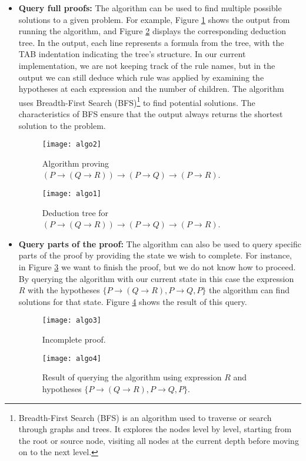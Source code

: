 \begin{itemize}
    \item \textbf{Query full proofs:} The algorithm can be used to find multiple possible solutions to a given problem. For example, Figure \ref{img:algo2} shows the output from running the algorithm, and Figure \ref{img:algo1} displays the corresponding deduction tree. In the output, each line represents a formula from the tree, with the TAB indentation indicating the tree's structure. In our current implementation, we are not keeping track of the rule names, but in the output we can still deduce which rule was applied by examining the hypotheses at each expression and the number of children. The algorithm uses Breadth-First Search (BFS)\footnote{Breadth-First Search (BFS) is an algorithm used to traverse or search through graphs and trees. It explores the nodes level by level, starting from the root or source node, visiting all nodes at the current depth before moving on to the next level.} to find potential solutions. The characteristics of BFS ensure that the output always returns the shortest solution to the problem.

    \begin{figure}[htbp]
        \centering
        \texttt{[image: algo2]}
        \caption{Algorithm proving \((P \to (Q \to R)) \to (P \to Q) \to (P \to R)\).}
        \label{img:algo2}
    \end{figure}

    \begin{figure}[htbp]
        \centering
        \texttt{[image: algo1]}
        \caption{Deduction tree for \((P \to (Q \to R)) \to (P \to Q) \to (P \to R)\).}
        \label{img:algo1}
    \end{figure}
        
    \item \textbf{Query parts of the proof:} The algorithm can also be used to query specific parts of the proof by providing the state we wish to complete. For instance, in Figure \ref{img:algo3} we want to finish the proof, but we do not know how to proceed. By querying the algorithm with our current state in this case the expression \(R\) with the hypotheses \(\{P \to (Q \to R), P \to Q, P\}\) the algorithm can find solutions for that state. Figure \ref{img:algo4} shows the result of this query.

    \begin{figure}[htbp]
        \centering
        \texttt{[image: algo3]}
        \caption{Incomplete proof.}
        \label{img:algo3}
    \end{figure}
        
    \begin{figure}[htbp]
        \centering
        \texttt{[image: algo4]}
        \caption{Result of querying the algorithm using expression \(R\) and hypotheses \(\{P \to (Q \to R), P \to Q, P\}\).}
        \label{img:algo4}
    \end{figure}
\end{itemize}




